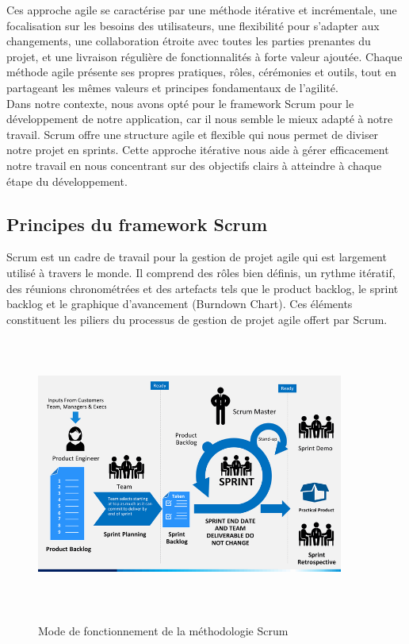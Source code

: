 Ces approche agile se caractérise par une méthode itérative et incrémentale, une focalisation sur les besoins des utilisateurs, une flexibilité pour s'adapter aux changements, une collaboration étroite avec toutes les parties prenantes du projet, et une livraison régulière de fonctionnalités à forte valeur ajoutée. Chaque méthode agile présente ses propres pratiques, rôles, cérémonies et outils, tout en partageant les mêmes valeurs et principes fondamentaux de l'agilité.\\

Dans notre contexte, nous avons opté pour le framework Scrum pour le développement de notre application, car il nous semble le mieux adapté à notre travail. Scrum offre une structure agile et flexible qui nous permet de diviser notre projet en sprints. Cette approche itérative nous aide à gérer efficacement notre travail en nous concentrant sur des objectifs clairs à atteindre à chaque étape du développement.





\subsection{ Principes du framework Scrum}
Scrum est un cadre de travail pour la gestion de projet agile qui est largement utilisé à travers le monde. Il comprend des rôles bien définis, un rythme itératif, des réunions chronométrées et des artefacts tels que le product backlog, le sprint backlog et le graphique d'avancement (Burndown Chart). Ces éléments constituent les piliers du processus de gestion de projet agile offert par Scrum.\\

\begin{figure}[htbp]
    \centering
    \includegraphics[width=0.9\textwidth,height=9cm]{chap1.images/scrum-process-slide2_2.png}
    \caption{Mode de fonctionnement de la méthodologie Scrum}\cite{ref1}
\end{figure}



